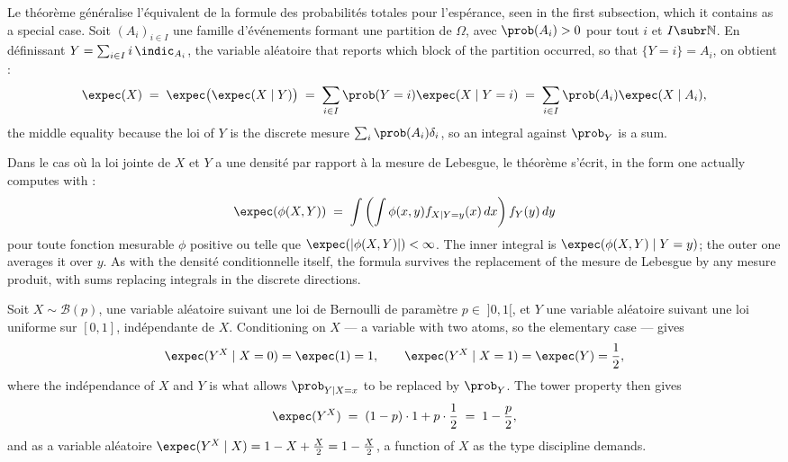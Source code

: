 \begin{remark}
  Le théorème généralise l'équivalent de la formule des probabilités totales pour
  l'espérance, seen in the first subsection, which it contains as a special case.
  Soit $(A_{i})_{i \in I}$ une famille d'événements formant une partition de
  $\Omega$, avec $\prob(A_{i}) > 0$ pour tout $i$ et $I \subr \mathbb{N}$. En
  définissant $Y = \sum_{i \in I} i \, \indic_{A_{i}}$, the variable aléatoire that
  reports which block of the partition occurred, so that $\{Y = i\} = A_{i}$, on
  obtient :
  \[
    \expec(X) \;=\; \expec\big( \expec(X \mid Y) \big)
    \;=\; \sum_{i \in I} \prob(Y = i) \expec(X \mid Y = i)
    \;=\; \sum_{i \in I} \prob(A_{i}) \expec(X \mid A_{i}) ,
  \]
  the middle equality because the loi of $Y$ is the discrete mesure
  $\sum_{i} \prob(A_{i}) \delta_{i}$, so an integral against $\prob_{Y}$ is a sum.
\end{remark}

Dans le cas où la loi jointe de $X$ et $Y$ a une densité par rapport à la mesure de
Lebesgue, le théorème s'écrit, in the form one actually computes with :
\begin{equation*}
  \expec(\phi(X,Y)) \;=\; \int \left( \int \phi(x,y) f_{X \mid Y = y}(x) \, dx \right) f_{Y}(y) \, dy
\end{equation*}
pour toute fonction mesurable $\phi$ positive ou telle que
$\expec(|\phi(X,Y)|) < \infty$. The inner integral is
$\expec(\phi(X,Y) \mid Y = y)$; the outer one averages it over $y$. As with the
densité conditionnelle itself, the formula survives the replacement of the mesure
de Lebesgue by any mesure produit, with sums replacing integrals in the discrete
directions.

\begin{example}
  Soit $X \sim \mathcal{B}(p)$, une variable aléatoire suivant une loi de Bernoulli
  de paramètre $p \in \;]0,1[$, et $Y$ une variable aléatoire suivant une loi
  uniforme sur $[0,1]$, indépendante de $X$. Conditioning on $X$ --- a variable
  with two atoms, so the elementary case --- gives
  \[
    \expec(Y^{X} \mid X = 0) = \expec(1) = 1 ,
    \qquad
    \expec(Y^{X} \mid X = 1) = \expec(Y) = \frac{1}{2} ,
  \]
  where the indépendance of $X$ and $Y$ is what allows $\prob_{Y \mid X = x}$ to be
  replaced by $\prob_{Y}$. The tower property then gives
  \[
    \expec(Y^{X}) \;=\; (1-p) \cdot 1 + p \cdot \frac{1}{2} \;=\; 1 - \frac{p}{2} ,
  \]
  and as a variable aléatoire
  $\expec(Y^{X} \mid X) = 1 - X + \tfrac{X}{2} = 1 - \tfrac{X}{2}$, a function of
  $X$ as the type discipline demands.
\end{example}

